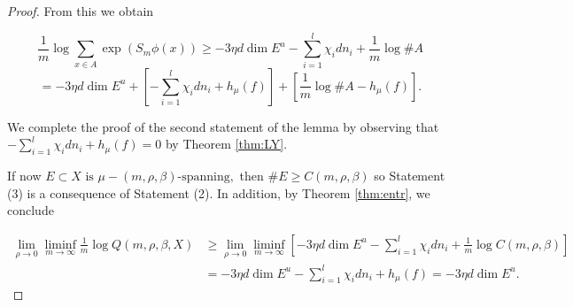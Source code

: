 \documentclass{amsart}
\theoremstyle{plain}
\theoremstyle{definition}
\theoremstyle{remark}
\numberwithin{equation}{section}
\begin{document}
\begin{proof}
From this we obtain

$$   \frac{1}{m} \log   \sum_{x\in A} \exp( S_m\phi (x))    \geq    - 3 \eta  d   \dim E^u      - \sum_{i=1}^l  \chi_i    d n_i    +   \frac{1}{m} \log \# A$$
$$ =    - 3 \eta  d   \dim E^u    + \left[  - \sum_{i=1}^l  \chi_i    d n_i  + h_{\mu}(f)\right]   +  \left[ \frac{1}{m} \log  \# A  - h_{\mu}(f)\right]. $$

We complete the proof of the second statement of the lemma by observing that $   - \sum_{i=1}^l  \chi_i    d n_i  + h_{\mu}(f) = 0$ by Theorem \ref{thm:LY}.

If now $    E\subset X \text{ is }  \mu-(m,\rho,\beta)  \text{-spanning},$ then $\# E\geq   C(m,\rho,\beta) $ so Statement (3) is a consequence of Statement (2).
In addition, by Theorem \ref{thm:entr}, we conclude


\begin{align*}
 \lim_{\rho \to 0} \liminf_{m\to \infty}   \frac{1}{m} \log   Q(m,\rho,\beta, X)    &   \geq   \lim_{\rho\to 0}  \liminf_{m\to\infty}  \left[   - 3 \eta  d   \dim E^u- \sum_{i=1}^l  \chi_i    d n_i    +   \frac{1}{m} \log  C(m,\rho,\beta) \right] \\
 & = - 3 \eta  d   \dim E^u     - \sum_{i=1}^l  \chi_i    d n_i  + h_{\mu}(f) =  - 3 \eta  d   \dim E^u.
\end{align*}




\end{proof}






\end{document}
